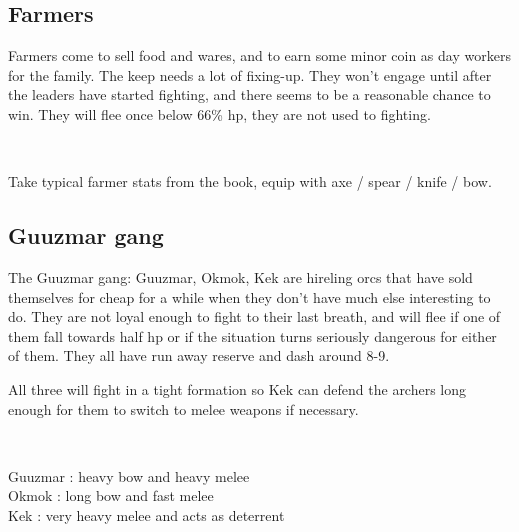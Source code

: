 

\begin{samepage}
\subsection*{Farmers}
Farmers come to sell food and wares, and to earn some minor coin as day workers for the family. The keep needs a lot of fixing-up. They won't engage until after the leaders have started fighting, and there seems to be a reasonable chance to win. They will flee once below 66\% hp, they are not used to fighting.

\

\noindent
Take typical farmer stats from the book, equip with axe / spear / knife / bow.
\end{samepage}


\begin{samepage}
\subsection*{Guuzmar gang}
\label{sec:guuzmarstats}
The Guuzmar gang: Guuzmar, Okmok, Kek are hireling orcs that have sold themselves for cheap for a while when they don't have much else interesting to do. They are not loyal enough to fight to their last breath, and will flee if one of them fall towards half hp or if the situation turns seriously dangerous for either of them. They all have run away reserve and dash around 8-9.

All three will fight in a tight formation so Kek can defend the archers long enough for them to switch to melee weapons if necessary.

\

\noindent    %
Guuzmar : heavy bow and heavy melee\\
Okmok :  long bow and fast melee\\
Kek : very heavy melee and acts as deterrent
\end{samepage}

\


